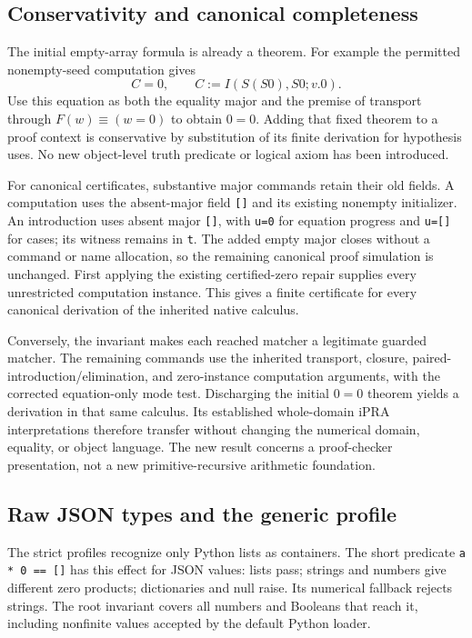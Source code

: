 \documentclass[11pt]{article}
\theoremstyle{definition}\newtheorem{definition}[theorem]{Definition}
\begin{document}
\subsection{Conservativity and canonical completeness}

The initial empty-array formula is already a theorem.  For example the
permitted nonempty-seed computation gives
\[
 C=0,\qquad C:=I(S(S0),S0;v.0).
\]
Use this equation as both the equality major and the premise of
transport through $F(w)\equiv(w=0)$ to obtain $0=0$.  Adding that fixed
theorem to a proof context is conservative by substitution of its
finite derivation for hypothesis uses.  No new object-level truth
predicate or logical axiom has been introduced.

For canonical certificates, substantive major commands retain their
old fields.  A computation uses the absent-major field \texttt{[]} and
its existing nonempty initializer.  An introduction uses absent major
\texttt{[]}, with \texttt{u=0} for equation progress and
\texttt{u=[]} for cases; its witness remains in \texttt{t}.
The added empty major closes without a command or name allocation, so
the remaining canonical proof simulation is unchanged.  First applying
the existing certified-zero repair supplies every unrestricted
computation instance.  This gives a finite certificate for every
canonical derivation of the inherited native calculus.

Conversely, the invariant makes each reached matcher a legitimate
guarded matcher.  The remaining commands use the inherited
transport, closure, paired-introduction/elimination, and zero-instance
computation arguments, with the corrected equation-only mode test.
Discharging the initial $0=0$ theorem yields a derivation in that same
calculus.  Its established whole-domain iPRA interpretations therefore
transfer without changing the numerical domain, equality, or object
language.  The new result concerns a proof-checker presentation, not a
new primitive-recursive arithmetic foundation.

\subsection{Raw JSON types and the generic profile}

The strict profiles recognize only Python lists as containers.  The
short predicate \texttt{a * 0 == []} has this effect for JSON values:
lists pass; strings and numbers give different zero products;
dictionaries and null raise.  Its numerical fallback rejects strings.
The root invariant covers all numbers and Booleans that reach it,
including nonfinite values accepted by the default Python loader.
\end{document}

